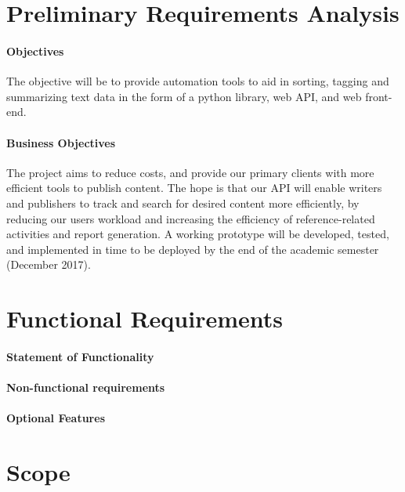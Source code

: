 \documentclass[12pt]{article}
\begin{document}
%
%

\section{Preliminary Requirements Analysis}

\paragraph{Objectives}
The objective will be to provide automation tools to aid in sorting, tagging and summarizing text data in the form of a python library, web API, and web front-end.

\paragraph{Business Objectives}
The project aims to reduce costs, and provide our primary clients with more efficient tools to publish content. The hope is that our API will enable writers and publishers to track and search for desired content more efficiently, by reducing our users workload and increasing the efficiency of reference-related activities and report generation. A working prototype will be developed, tested, and implemented in time to be deployed by the end of the academic semester (December 2017).

%
%

\section{Functional Requirements}

\paragraph{Statement of Functionality}

\paragraph{Non-functional requirements}

\paragraph{Optional Features}

%
%

\section{Scope}
\end{document}
